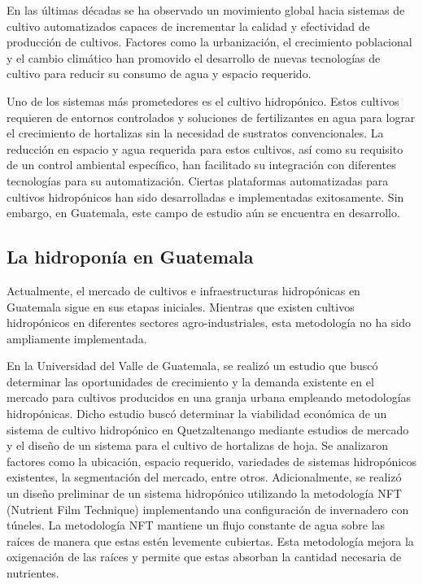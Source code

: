 En las últimas décadas se ha observado un movimiento global hacia sistemas de cultivo automatizados capaces de incrementar la calidad y efectividad de producción de cultivos. Factores como la urbanización, el crecimiento poblacional y el cambio climático han promovido el desarrollo de nuevas tecnologías de cultivo para reducir su consumo de agua y espacio requerido.

Uno de los sistemas más prometedores es el cultivo hidropónico. Estos cultivos requieren de entornos controlados y soluciones de fertilizantes en agua para lograr el crecimiento de hortalizas sin la necesidad de sustratos convencionales. La reducción en espacio y agua requerida para estos cultivos, así como su requisito de un control ambiental específico, han facilitado su integración con diferentes tecnologías para su automatización. Ciertas plataformas automatizadas para cultivos hidropónicos han sido desarrolladas e implementadas exitosamente. Sin embargo, en Guatemala, este campo de estudio aún se encuentra en desarrollo.

\subsection*{La hidroponía en Guatemala}
Actualmente, el mercado de cultivos e infraestructuras hidropónicas en Guatemala sigue en sus etapas iniciales. Mientras que existen cultivos hidropónicos en diferentes sectores agro-industriales, esta metodología no ha sido ampliamente implementada.

En la Universidad del Valle de Guatemala, se realizó un estudio que buscó determinar las oportunidades de crecimiento y la demanda existente en el mercado para cultivos producidos en una granja urbana empleando metodologías hidropónicas. \cite{gonzalez_natareno2021_tesis} Dicho estudio buscó determinar la viabilidad económica de un sistema de cultivo hidropónico en Quetzaltenango mediante estudios de mercado y el diseño de un sistema para el cultivo de hortalizas de hoja. Se analizaron factores como la ubicación, espacio requerido, variedades de sistemas hidropónicos existentes, la segmentación del mercado, entre otros. Adicionalmente, se realizó un diseño preliminar de un sistema hidropónico utilizando la metodología NFT (Nutrient Film Technique) implementando una configuración de invernadero con túneles. La metodología NFT mantiene un flujo constante de agua sobre las raíces de manera que estas estén levemente cubiertas. Esta metodología mejora la oxigenación de las raíces y permite que estas absorban la cantidad necesaria de nutrientes. 

